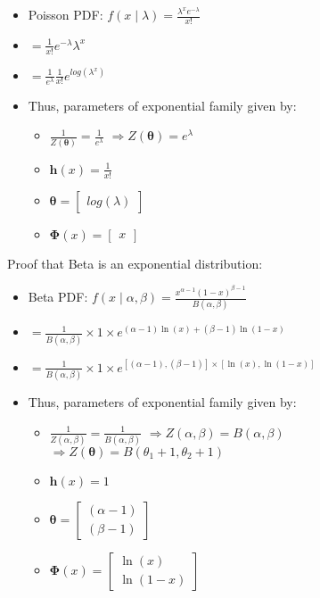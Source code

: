 \begin{itemize}
    \item Poisson PDF:
    $
    f(x \mid \lambda) = \frac{\lambda^x e^{-\lambda}}{x!}
    $
    \item $
    = \frac{1}{x!}e^{-\lambda} \lambda^x
    $
    \item $
    = \frac{1}{e^\lambda}\frac{1}{x!} e^{log(\lambda^x)}
    $
    \item Thus, parameters of exponential family given by:
    \begin{itemize}
        \item $\frac{1}{Z(\boldsymbol{\theta})} = \frac{1}{e^\lambda}$
        $ \Rightarrow
        Z(\boldsymbol{\theta}) = e^\lambda
        $
        \item $\boldsymbol{h}(x) = \frac{1}{x!}$
        \item $\boldsymbol{\theta} = \begin{bmatrix}
        log(\lambda)
        \end{bmatrix}$
        \item $
        \boldsymbol{\Phi}(x) = \begin{bmatrix}
        x
        \end{bmatrix}
        $
    \end{itemize}
\end{itemize}
Proof that Beta is an exponential distribution:
\begin{itemize}
    \item Beta PDF: $
    f(x \mid \alpha, \beta) = \frac{x^{\alpha - 1} (1 - x)^{\beta - 1}}{B(\alpha, \beta)}
    $
    \item 
    $
    = \frac{1}{B(\alpha, \beta)} \times 1 \times  e^{(\alpha - 1) \ln(x) + (\beta - 1) \ln(1 - x)}
    $
    \item 
    $
    = \frac{1}{B(\alpha, \beta)} \times 1 \times  e^{[(\alpha - 1),(\beta - 1)] \times [\ln(x), \ln(1 - x)]}
    $
    \item Thus, parameters of exponential family given by:
    \begin{itemize}
        \item $\frac{1}{Z(\alpha, \beta)} = \frac{1}{B(\alpha, \beta)}$
        $ \Rightarrow
        Z(\alpha, \beta) = B(\alpha, \beta)
        $
        $ \Rightarrow
        Z(\boldsymbol{\theta}) = B(\theta_1 + 1, \theta_2 + 1)
        $
        \item $\boldsymbol{h}(x) = 1$
        \item $\boldsymbol{\theta} = \begin{bmatrix}
        (\alpha - 1)\\
        (\beta - 1)
        \end{bmatrix}$
        \item $
        \boldsymbol{\Phi}(x) = \begin{bmatrix}
        \ln(x)\\
        \ln(1-x)
        \end{bmatrix}
        $
    \end{itemize}
\end{itemize}
